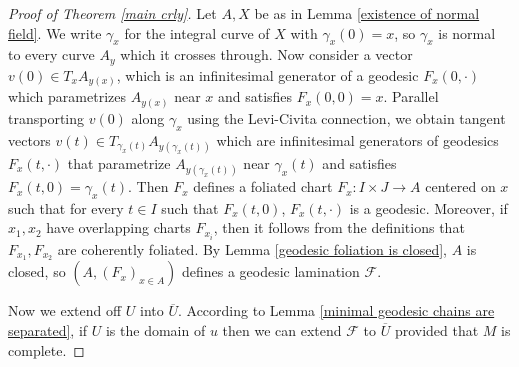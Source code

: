 \documentclass[reqno,12pt,letterpaper]{amsart}
\theoremstyle{definition}
\numberwithin{equation}{section}
\begin{document}
\begin{proof}[Proof of Theorem \ref{main crly}]
Let $A,X$ be as in Lemma \ref{existence of normal field}.
We write $\gamma_x$ for the integral curve of $X$ with $\gamma_x(0) = x$, so $\gamma_x$ is normal to every curve $A_y$ which it crosses through.
Now consider a vector $v(0) \in T_x A_{y(x)}$, which is an infinitesimal generator of a geodesic $F_x(0, \cdot)$ which parametrizes $A_{y(x)}$ near $x$ and satisfies $F_x(0, 0) = x$.
Parallel transporting $v(0)$ along $\gamma_x$ using the Levi-Civita connection, we obtain tangent vectors $v(t) \in T_{\gamma_x(t)} A_{y(\gamma_x(t))}$ which are infinitesimal generators of geodesics $F_x(t, \cdot)$ that parametrize $A_{y(\gamma_x(t))}$ near $\gamma_x(t)$ and satisfies $F_x(t, 0) = \gamma_x(t)$.
Then $F_x$ defines a foliated chart $F_x: I \times J \to A$ centered on $x$ such that for every $t \in I$ such that $F_x(t, 0)$, $F_x(t, \cdot)$ is a geodesic.
Moreover, if $x_1, x_2$ have overlapping charts $F_{x_i}$, then it follows from the definitions that $F_{x_1},F_{x_2}$ are coherently foliated.
By Lemma \ref{geodesic foliation is closed}, $A$ is closed, so $(A, (F_x)_{x \in A})$ defines a geodesic lamination $\mathscr F$.

Now we extend off $U$ into $\overline U$.
According to Lemma \ref{minimal geodesic chains are separated}, if $U$ is the domain of $u$ then we can extend $\mathscr F$ to $\overline U$ provided that $M$ is complete.
\end{proof}



\printbibliography
\end{document}

